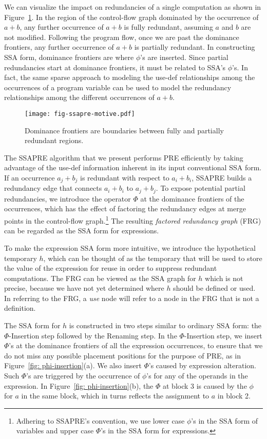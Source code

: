 We can visualize the impact on redundancies of a single computation
as shown in Figure~\ref{fig: ssapre-motive}.  
In the region of the control-flow graph dominated by the occurrence of $a+b$, 
any further occurrence of $a+b$ is fully redundant, assuming $a$ and $b$ are
not modified.  Following the program flow,
once we are past the dominance frontiers, any further occurrence of $a+b$ is
partially redundant.  In constructing SSA form, dominance frontiers are where
$\phi$'s are inserted.   Since partial redundancies start at dominance
frontiers, it must be related to SSA's $\phi$'s.  In fact, the same sparse
approach to modeling the use-def relationships among the occurrences of
a program variable can be used to model the redundancy relationships among 
the different occurrences of $a+b$.

\begin{figure}
\centering
\texttt{[image: fig-ssapre-motive.pdf]}
\caption{Dominance frontiers are boundaries between fully and partially redundant regions.}
\label{fig: ssapre-motive}
\end{figure}

The SSAPRE algorithm that we present performs PRE efficiently by taking 
advantage of the use-def information inherent in its input conventional SSA 
form.  If an occurrence $a_j+b_j$ is redundant with respect to $a_i+b_i$, SSAPRE
builds a redundancy edge that connects $a_i+b_i$ to
$a_j+b_j$.  To expose potential partial redundancies, we introduce the 
operator $\Phi$ at the dominance frontiers of the occurrences, which has the 
effect of factoring the redundancy edges at merge points in the control-flow graph.\footnote{Adhering to SSAPRE's convention, we use lower case 
$\phi$'s in the SSA form of variables and upper case $\Phi$'s
in the SSA form for expressions.} The resulting \emph{factored redundancy 
graph} (FRG) can be regarded as the SSA form for expressions.

To make the expression SSA form more intuitive, we introduce the 
hypothetical temporary $h$,
which can be thought of as the temporary that will be used to store the value
of the expression for reuse in order to suppress redundant computations.
The FRG can be viewed as the SSA graph for $h$ which is not precise,
because we have not yet determined where $h$ should be defined or used.
In referring to the FRG, a \emph{use} node will refer to a node in the FRG
that is not a definition.

The SSA form for $h$ is constructed in two steps similar to ordinary SSA
form: the $\Phi$-Insertion step followed by the Renaming step.  
In the $\Phi$-Insertion 
step, we insert $\Phi$'s at the dominance frontiers of all the expression 
occurrences, to ensure that we do not miss any possible placement positions
for the purpose of PRE, as in Figure~\ref{fig: phi-insertion}(a).
We also insert $\Phi$'s caused by expression alteration.
Such $\Phi$'s are triggered by the occurrence of $\phi$'s
for any of the operands in the expression.
In Figure~\ref{fig: phi-insertion}(b), the $\Phi$ at block 3 is caused by
the $\phi$ for $a$ in the same block, which in turns reflects the
assignment to $a$ in block 2.

